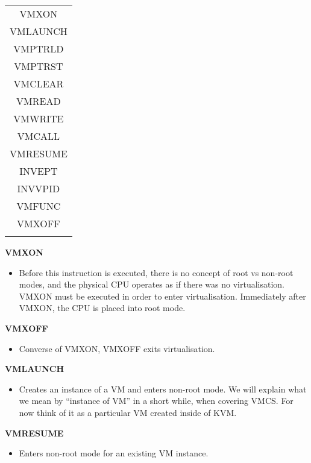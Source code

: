 \documentclass{report}
\begin{document}
\begin{spacing}{1.5}
{\begin{longtable}{c}
    \large{VMXON} \\
    \large{VMLAUNCH} \\
    \large{VMPTRLD} \\
    \large{VMPTRST} \\
    \large{VMCLEAR} \\
    \large{VMREAD} \\
    \large{VMWRITE} \\
    \large{VMCALL} \\
    \large{VMRESUME} \\
    \large{INVEPT} \\
    \large{INVVPID} \\
    \large{VMFUNC} \\
    \large{VMXOFF} \\
    \newline
\end{longtable}


{\large

\textbf{VMXON}
\begin{itemize}
\item[] Before this instruction is executed, there is no concept of root vs non-root modes, and the physical CPU operates as if there was no virtualisation. VMXON must be executed in order to enter virtualisation. Immediately after VMXON, the CPU is placed into root mode.
\end{itemize}


\textbf{VMXOFF}
\begin{itemize}
\item[] {\large Converse of VMXON, VMXOFF exits virtualisation. }
\end{itemize}


\textbf{VMLAUNCH}
\begin{itemize}
\item[] Creates an instance of a VM and enters non-root mode. We will explain what we mean by “instance of VM” in a short while, when covering VMCS. For now think of it as a particular VM created inside of KVM.
\end{itemize}


\textbf{VMRESUME}
\begin{itemize}
\item[] Enters non-root mode for an existing VM instance.
\end{itemize}
\leavevmode\newline
}



}
\end{spacing}
\end{document}
